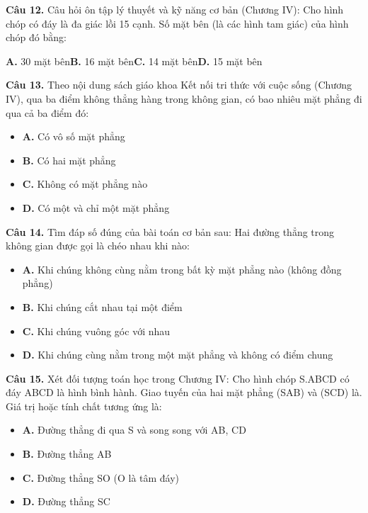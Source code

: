 \documentclass[11pt,a4paper]{article}
\begin{document}
\textbf{\color{primary} Câu 12.} Câu hỏi ôn tập lý thuyết và kỹ năng cơ bản (Chương IV): Cho hình chóp có đáy là đa giác lồi 15 cạnh. Số mặt bên (là các hình tam giác) của hình chóp đó bằng:\par
\hspace*{1.5em}\textbf{A.} 30 mặt bên\quad\quad \textbf{B.} 16 mặt bên\quad\quad \textbf{C.} 14 mặt bên\quad\quad \textbf{D.} 15 mặt bên\par\vspace{2pt}
\textbf{\color{primary} Câu 13.} Theo nội dung sách giáo khoa Kết nối tri thức với cuộc sống (Chương IV), qua ba điểm không thẳng hàng trong không gian, có bao nhiêu mặt phẳng đi qua cả ba điểm đó:\par
\begin{itemize}\setlength{\itemsep}{1pt}\setlength{\parskip}{0pt}
  \item[] \textbf{A.} Có vô số mặt phẳng
  \item[] \textbf{B.} Có hai mặt phẳng
  \item[] \textbf{C.} Không có mặt phẳng nào
  \item[] \textbf{D.} Có một và chỉ một mặt phẳng
\end{itemize}\vspace{2pt}
\textbf{\color{primary} Câu 14.} Tìm đáp số đúng của bài toán cơ bản sau: Hai đường thẳng trong không gian được gọi là chéo nhau khi nào:\par
\begin{itemize}\setlength{\itemsep}{1pt}\setlength{\parskip}{0pt}
  \item[] \textbf{A.} Khi chúng không cùng nằm trong bất kỳ mặt phẳng nào (không đồng phẳng)
  \item[] \textbf{B.} Khi chúng cắt nhau tại một điểm
  \item[] \textbf{C.} Khi chúng vuông góc với nhau
  \item[] \textbf{D.} Khi chúng cùng nằm trong một mặt phẳng và không có điểm chung
\end{itemize}\vspace{2pt}
\textbf{\color{primary} Câu 15.} Xét đối tượng toán học trong Chương IV: Cho hình chóp S.ABCD có đáy ABCD là hình bình hành. Giao tuyến của hai mặt phẳng (SAB) và (SCD) là. Giá trị hoặc tính chất tương ứng là:\par
\begin{itemize}\setlength{\itemsep}{1pt}\setlength{\parskip}{0pt}
  \item[] \textbf{A.} Đường thẳng đi qua S và song song với AB, CD
  \item[] \textbf{B.} Đường thẳng AB
  \item[] \textbf{C.} Đường thẳng SO (O là tâm đáy)
  \item[] \textbf{D.} Đường thẳng SC
\end{itemize}\vspace{2pt}
\end{document}
